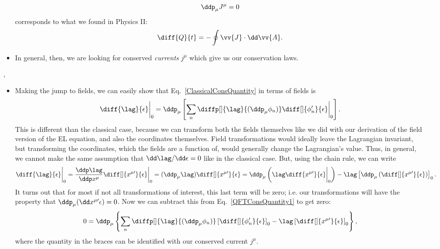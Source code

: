 \begin{itemize}
        \begin{equation*}
            \ddp_{\mu}J^{\mu} = 0
        \end{equation*}
        corresponds to what we found in Physics II:
        \begin{equation*}
            \diff{Q}{t} = -\oint \vv{J} \cdot \dd\vv{A}.
        \end{equation*}
    \item In general, then, we are looking for conserved \textit{currents} $j^{\mu}$ which give us our conservation laws.
\end{itemize}


\sep


\begin{itemize}
    \item Making the jump to fields, we can easily show that Eq.~\eqref{ClassicalConsQuantity} in terms of fields is
        \begin{equation}
            \diff{\lag}{\epsilon}\bigg|_0 = \ddp_{\mu} \left[\sum_n \diffp[]{\lag}{(\ddp_{\mu}\phi_n)} \diff[]{\phi_n'}{\epsilon}\bigg|_0\right].\label{QFTConsQuantity1}
        \end{equation}
        This is different than the classical case, because we can transform both the fields themselves like we did with our derivation of the field version of the EL equation, and also the coordinates themselves. Field transformations would ideally leave the Lagrangian invariant, but transforming the coordinates, which the fields are a function of, would generally change the Lagrangian's value. Thus, in general, we cannot make the same assumption that $\dd\lag/\dd\epsilon=0$ like in the classical case. But, using the chain rule, we can write
        \begin{equation*}
            \diff{\lag}{\epsilon}\bigg|_0 = \frac{\ddp\lag}{\ddp x^{\mu}} \diff[]{x^{\mu\prime}}{\epsilon}\bigg|_0 = (\ddp_{\mu}\lag)\diff[]{x^{\mu\prime}}{\epsilon} = \ddp_{\mu}\left(\lag \diff{x^{\mu\prime}}{\epsilon}\bigg|_0\right) - \lag\left[\ddp_{\mu}\left(\diff[]{x^{\mu\prime}}{\epsilon}\right)\right]_0.
        \end{equation*}
        It turns out that for most if not all transformations of interest, this last term will be zero; i.e. our transformations will have the property that $\ddp_{\mu}(\dd x^{\mu\prime}{\epsilon}) = 0$. Now we can subtract this from Eq.~\eqref{QFTConsQuantity1} to get zero:
        \begin{equation}
            0 = \ddp_{\mu} \left\{\sum_n \diffp[]{\lag}{(\ddp_{\mu}\phi_n)}\left[\diff[]{\phi_n'}{\epsilon}\right]_0 - \lag\left[\diff[]{x^{\mu\prime}}{\epsilon}\right]_0\right\},\label{QFTConsQuantity2}
        \end{equation}
        where the quantity in the braces can be identified with our conserved current $j^{\mu}$.
\end{itemize}

